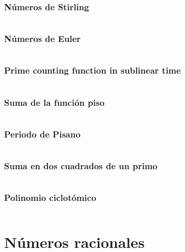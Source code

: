 \documentclass[11pt]{article}
\begin{document}
			\subsubsection{Números de Stirling}
			\inputminted[tabsize=2,breaklines,firstline=967,lastline=988,fontsize=\small]{c++}{numberTheory.cpp}
			
			\subsubsection{Números de Euler}
			\inputminted[tabsize=2,breaklines,firstline=990,lastline=1001,fontsize=\small]{c++}{numberTheory.cpp}
			
			\subsubsection{Prime counting function in sublinear time}
			\inputminted[tabsize=2,breaklines,fontsize=\small]{c++}{pi.cpp}
			
			\subsubsection{Suma de la función piso}
			\inputminted[tabsize=2,breaklines,firstline=1003,lastline=1022,fontsize=\small]{c++}{numberTheory.cpp}
			
			\subsubsection{Periodo de Pisano}
			\inputminted[tabsize=2,breaklines,firstline=1049,lastline=1076,fontsize=\small]{c++}{numberTheory.cpp}
			
			\subsubsection{Suma en dos cuadrados de un primo}
			\inputminted[tabsize=2,breaklines,firstline=1098,lastline=1117,fontsize=\small]{c++}{numberTheory.cpp}
			
			\subsubsection{Polinomio ciclotómico}
			\inputminted[tabsize=2,breaklines,firstline=1078,lastline=1096,fontsize=\small]{c++}{numberTheory.cpp}
			
	\newpage
	\section{Números racionales}
\end{document}
